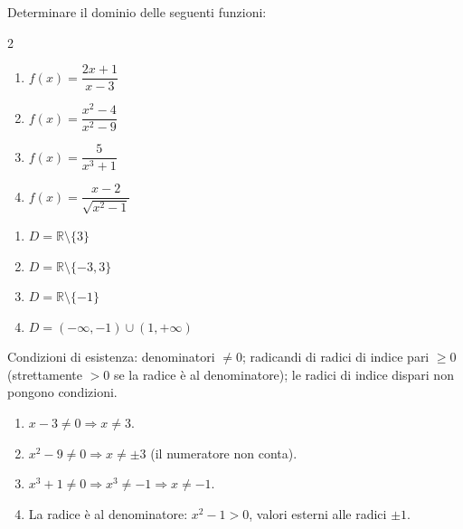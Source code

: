 \begin{question}[ID=2.1, subtitle={Dominio di funzioni razionali}, difficulty=facile, tags={dominio,razionali}]
Determinare il dominio delle seguenti funzioni:
\begin{center}\begin{minipage}{0.92\linewidth}
\begin{multicols}{2}
\begin{enumerate}[leftmargin=3.2cm]
\item $f(x)=\dfrac{2x+1}{x-3}$
\item $f(x)=\dfrac{x^2-4}{x^2-9}$
\item $f(x)=\dfrac{5}{x^3+1}$
\item $f(x)=\dfrac{x-2}{\sqrt{x^2-1}}$
\end{enumerate}
\end{multicols}
\end{minipage}\end{center}
\begin{solution}
\begin{enumerate}
    \item $D=\mathbb{R}\setminus\{3\}$
    \item $D=\mathbb{R}\setminus\{-3,3\}$
    \item $D=\mathbb{R}\setminus\{-1\}$
    \item $D=(-\infty,-1)\cup(1,+\infty)$
\end{enumerate}
\end{solution}
\begin{explanation}
Condizioni di esistenza: denominatori $\neq0$; radicandi di radici di indice pari $\geq0$ (strettamente $>0$ se la radice è al denominatore); le radici di indice dispari non pongono condizioni.
\begin{enumerate}
    \item $x-3\neq0 \Rightarrow x\neq3$.
    \item $x^2-9\neq0 \Rightarrow x\neq\pm3$ (il numeratore non conta).
    \item $x^3+1\neq0 \Rightarrow x^3\neq-1 \Rightarrow x\neq-1$.
    \item La radice è al denominatore: $x^2-1>0$, valori esterni alle radici $\pm1$.
\end{enumerate}
\end{explanation}
\end{question}

